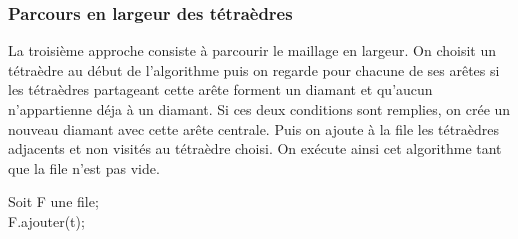 \subsubsection{Parcours en largeur des tétraèdres}
\label{parcours_largeur}
\noindent
La troisième approche consiste à parcourir le maillage en largeur. On choisit un tétraèdre au début de l'algorithme puis on regarde pour chacune de ses arêtes si les tétraèdres partageant cette arête forment un diamant et qu'aucun n'appartienne déja à un diamant. Si ces deux conditions sont remplies, on crée un nouveau diamant avec cette arête centrale. Puis on ajoute à la file les tétraèdres adjacents et non visités au tétraèdre choisi. On exécute ainsi cet algorithme tant que la file n'est pas vide.\\
\begin{algorithm}[th]
{
\SetAlgoLined	
 Soit F une file;\\
 F.ajouter(t);\\
}
 \caption{Parcours en largeur du maillage avec un tétraèdre de départ t}
\end{algorithm}

